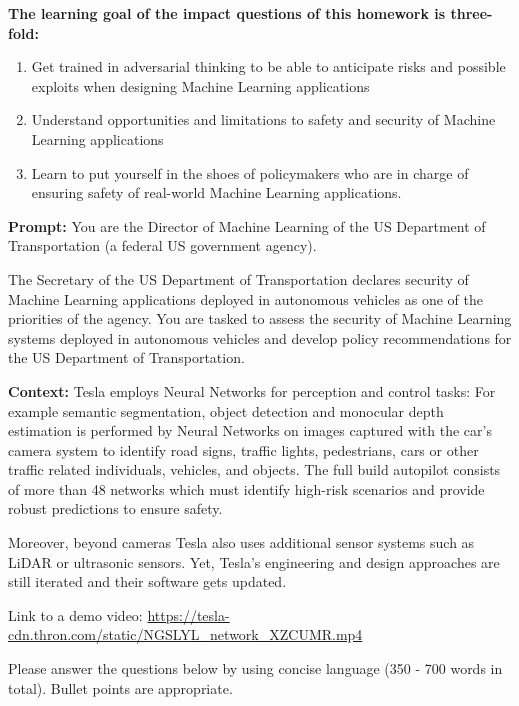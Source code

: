 \documentclass[submit]{harvardml}
\begin{document}
\begin{problem}

\textbf{The learning goal of the impact questions of this homework is
three-fold: }

\begin{enumerate}
\item
  Get trained in adversarial thinking to be able to anticipate risks and
  possible exploits when designing Machine Learning applications
\item
  Understand opportunities and limitations to safety and security of
  Machine Learning applications
\item
  Learn to put yourself in the shoes of policymakers who are in charge
  of ensuring safety of real-world Machine Learning applications.
\end{enumerate}

\textbf{Prompt: }You are the Director of Machine Learning of the US
Department of Transportation (a federal US government agency).

The Secretary of the US Department of Transportation declares security
of Machine Learning applications deployed in autonomous vehicles as one
of the priorities of the agency. You are tasked to assess the security
of Machine Learning systems deployed in autonomous vehicles and develop
policy recommendations for the US Department of Transportation.

\textbf{Context: }Tesla employs Neural Networks for perception and
control tasks: For example semantic segmentation, object detection and
monocular depth estimation is performed by Neural Networks on images
captured with the car's camera system to identify road signs, traffic
lights, pedestrians, cars or other traffic related individuals,
vehicles, and objects. The full build autopilot consists of more than 48
networks which must identify high-risk scenarios and provide robust
predictions to ensure safety.

Moreover, beyond cameras Tesla also uses additional sensor systems such
as LiDAR or ultrasonic sensors. Yet, Tesla's engineering and design
approaches are still iterated and their software gets updated.

Link to a demo video: \url{https://tesla-cdn.thron.com/static/NGSLYL_network_XZCUMR.mp4}

Please answer the questions below by using concise language (350 - 700
words in total). Bullet points are appropriate.


\end{problem}
\end{document}
